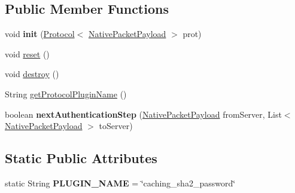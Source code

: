\subsection*{Public Member Functions}
\begin{DoxyCompactItemize}
\item 
\mbox{\label{classcom_1_1mysql_1_1cj_1_1protocol_1_1a_1_1authentication_1_1_caching_sha2_password_plugin_a1f6a325af990916ce300b592abc9916c}} 
void {\bfseries init} (\mbox{\hyperlink{interfacecom_1_1mysql_1_1cj_1_1protocol_1_1_protocol}{Protocol}}$<$ \mbox{\hyperlink{classcom_1_1mysql_1_1cj_1_1protocol_1_1a_1_1_native_packet_payload}{Native\+Packet\+Payload}} $>$ prot)
\item 
void \mbox{\hyperlink{classcom_1_1mysql_1_1cj_1_1protocol_1_1a_1_1authentication_1_1_caching_sha2_password_plugin_a7f042851c3087a8bdf431023ed01b29c}{reset}} ()
\item 
void \mbox{\hyperlink{classcom_1_1mysql_1_1cj_1_1protocol_1_1a_1_1authentication_1_1_caching_sha2_password_plugin_ae1487e57db91585f60ffa884c6f10a54}{destroy}} ()
\item 
String \mbox{\hyperlink{classcom_1_1mysql_1_1cj_1_1protocol_1_1a_1_1authentication_1_1_caching_sha2_password_plugin_adefb39fe1f5c9624bf96076a6be9ffc0}{get\+Protocol\+Plugin\+Name}} ()
\item 
\mbox{\label{classcom_1_1mysql_1_1cj_1_1protocol_1_1a_1_1authentication_1_1_caching_sha2_password_plugin_ac9b5781a9b319a2d81290a0a115a4039}} 
boolean {\bfseries next\+Authentication\+Step} (\mbox{\hyperlink{classcom_1_1mysql_1_1cj_1_1protocol_1_1a_1_1_native_packet_payload}{Native\+Packet\+Payload}} from\+Server, List$<$ \mbox{\hyperlink{classcom_1_1mysql_1_1cj_1_1protocol_1_1a_1_1_native_packet_payload}{Native\+Packet\+Payload}} $>$ to\+Server)
\end{DoxyCompactItemize}
\subsection*{Static Public Attributes}
\begin{DoxyCompactItemize}
\item 
\mbox{\label{classcom_1_1mysql_1_1cj_1_1protocol_1_1a_1_1authentication_1_1_caching_sha2_password_plugin_aa7f4c70496cc6da39887f311423d086c}} 
static String {\bfseries P\+L\+U\+G\+I\+N\+\_\+\+N\+A\+ME} = \char`\"{}caching\+\_\+sha2\+\_\+password\char`\"{}
\end{DoxyCompactItemize}
